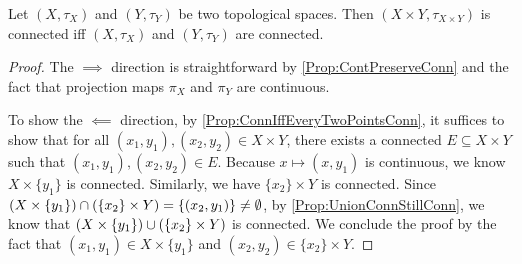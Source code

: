\documentclass[screen,single]{techreport}
\numberwithin{equation}{section}
\begin{document}
\begin{proposition}\label{Prop:ProdConnIffBothConn}
	Let $(X,\tau_X)$ and $(Y,\tau_Y)$ be two topological spaces.
	Then $(X\times Y,\tau_{X \times Y})$ is connected iff $(X,\tau_X)$ and $(Y,\tau_Y)$ are connected.
\end{proposition}
\begin{proof}
	The $\implies$ direction is straightforward by \cref{Prop:ContPreserveConn} and the fact that projection maps $\pi_X$ and $\pi_Y$ are continuous.
	
	To show the $\impliedby$ direction, by \ref{Prop:ConnIffEveryTwoPointsConn}, it suffices to show that for all $(x_1,y_1),(x_2,y_2) \in X \times Y$, there exists a connected $E \subseteq X \times Y$ such that $(x_1,y_1),(x_2,y_2) \in E$.
	Because $x \mapsto (x,y_1)$ is continuous, we know $X \times \{y_1\}$ is connected.
	Similarly, we have $\{x_2\} \times Y$ is connected.
	Since $(X \times \{ {y_1} \}) \cap (\{ {x_2} \} \times Y) = \{ (x_2,y_1) \} \neq \emptyset$, by \cref{Prop:UnionConnStillConn}, we know that $(X \times \{ {y_1} \}) \cup (\{ {x_2} \} \times Y)$ is connected.
	We conclude the proof by the fact that $(x_1,y_1) \in X \times \{y_1\}$ and $(x_2,y_2) \in \{x_2\} \times Y$.
\end{proof}
\end{document}
